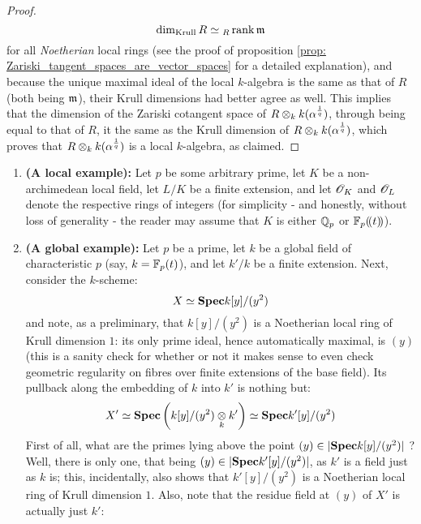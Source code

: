 \begin{proof}
                            $$\dim_{\mathrm{Krull}} R \simeq {}_R\operatorname{rank} \mathfrak{m}$$
                        for all \textit{Noetherian} local rings (see the proof of proposition \ref{prop: Zariski_tangent_spaces_are_vector_spaces} for a detailed explanation), and because the unique maximal ideal of the local $k$-algebra is the same as that of $R$ (both being $\mathfrak{m}$), their Krull dimensions had better agree as well. This implies that the dimension of the Zariski cotangent space of $R \tensor_k k(\alpha^{\frac1q})$, through being equal to that of $R$, it the same as the Krull dimension of $R \tensor_k k(\alpha^{\frac1q})$, which proves that $R \tensor_k k(\alpha^{\frac1q})$ is a local $k$-algebra, as claimed. 
                    \end{proof}
                
                \begin{example} \label{example: regular_schemes}
                    \noindent
                    \begin{enumerate}
                        \item \textbf{(A local example):} Let $p$ be some arbitrary prime, let $K$ be a non-archimedean local field, let $L/K$ be a finite extension, and let $\mathscr{O}_K$ and $\mathscr{O}_L$ denote the respective rings of integers (for simplicity - and honestly, without loss of generality - the reader may assume that $K$ is either $\mathbb{Q}_p$ or $\mathbb{F}_p(\!(t)\!)$). 
                        \item \textbf{(A global example):} \cite[\href{https://stacks.math.columbia.edu/tag/038Y}{Tag 038Y}]{stacks} Let $p$ be a prime, let $k$ be a global field of characteristic $p$ (say, $k = \mathbb{F}_p(t)$), and let $k'/k$ be a finite extension. Next, consider the $k$-scheme:
                            $$X \simeq \mathbf{Spec} k[y]/(y^2)$$
                        and note, as a preliminary, that $k[y]/(y^2)$ is a Noetherian local ring of Krull dimension $1$: its only prime ideal, hence automatically maximal, is $(y)$ (this is a sanity check for whether or not it makes sense to even check geometric regularity on fibres over finite extensions of the base field). Its pullback along the embedding of $k$ into $k'$ is nothing but:
                            $$X' \cong \Spec \left(k[y]/(y^2) \tensor_k k'\right) \cong \Spec k'[y]/(y^2)$$
                        First of all, what are the primes lying above the point $(y) \in |\mathbf{Spec} k[y]/(y^2)|$ ? Well, there is only one, that being $(y) \in |\mathbf{Spec} k'[y]/(y^2)|$, as $k'$ is a field just as $k$ is; this, incidentally, also shows that $k'[y]/(y^2)$ is a Noetherian local ring of Krull dimension $1$. Also, note that the residue field at $(y)$ of $X'$ is actually just $k'$:

\end{enumerate}
\end{example}
